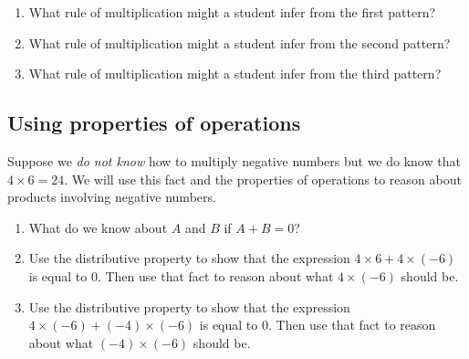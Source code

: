 \begin{prob}
\begin{enumerate}
\item What rule of multiplication might a student infer from the first pattern? 
\item What rule of multiplication might a student infer from the second pattern?
\item What rule of multiplication might a student infer from the third pattern?
\end{enumerate}
\end{prob}

\subsection*{Using properties of operations}

\begin{prob}
Suppose we \emph{do not know} how to multiply negative numbers but we do know that $4\times 6=24$. We will use this fact and the properties of operations to reason about products involving negative numbers.  
\begin{enumerate}
\item What do we know about $A$ and $B$ if $A+B=0$?  
\item Use the distributive property to show that the expression $4\times 6 + 4\times(-6)$ is equal to $0$.  
Then use that fact to reason about what $4\times(-6)$ should be.  
\item Use the distributive property to show that the expression $4\times (-6) + (-4)\times (-6)$ is equal to $0$.  
Then use that fact to reason about what $(-4)\times(-6)$ should be.  
\end{enumerate}
\end{prob}

